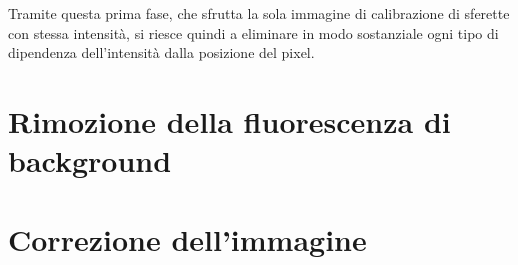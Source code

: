 Tramite questa prima fase, che sfrutta la sola immagine di calibrazione di sferette con stessa intensità, si riesce quindi a eliminare in modo sostanziale ogni tipo di dipendenza dell'intensità dalla posizione del pixel. 

\section{Rimozione della fluorescenza di background}



\section{Correzione dell'immagine}


